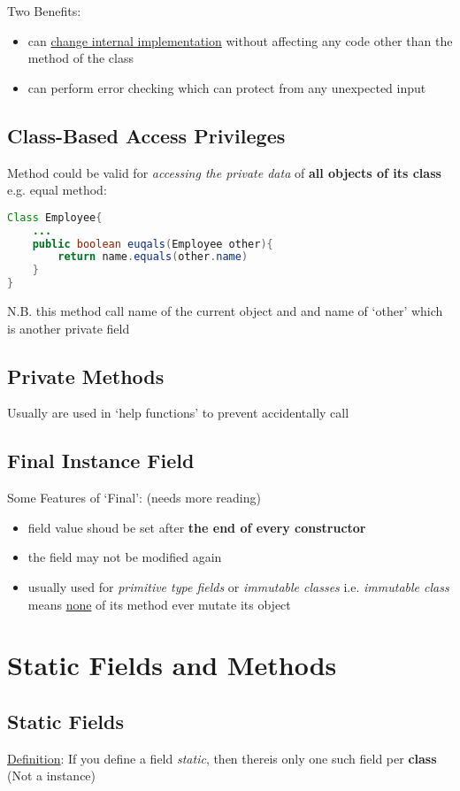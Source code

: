 \documentclass[12pt]{article}
\begin{document}
Two Benefits:
\begin{itemize}
    \item can \underline{change internal implementation} without affecting any code other than the method of the class
    \item can perform error checking which can protect from any unexpected input
\end{itemize}

\subsection{Class-Based Access Privileges}
Method could be valid for \textit{accessing the private data} of \textbf{all objects of its class} \newline
e.g. equal method:
\begin{lstlisting}[language=Java]
Class Employee{
    ...
    public boolean euqals(Employee other){
        return name.equals(other.name)
    }
}   
\end{lstlisting}
N.B. this method call name of the current object and and name of `other' which is another private field 

\subsection{Private Methods}
Usually are used in `help functions' to prevent accidentally call

\subsection{Final Instance Field}
Some Features of `Final': (needs more reading)
\begin{itemize}
    \item field value shoud be set after \textbf{the end of every constructor}
    \item the field may not be modified again
    \item usually used for \textit{primitive type fields} or \textit{immutable classes}\newline
    i.e. \emph{immutable class} means \underline{none} of its method ever mutate its object
\end{itemize}

\section{Static Fields and Methods}
\subsection{Static Fields}
\underline{Definition}: If you define a field \emph{static}, then thereis only one such field per \textbf{class}
(Not a instance)
\end{document}
